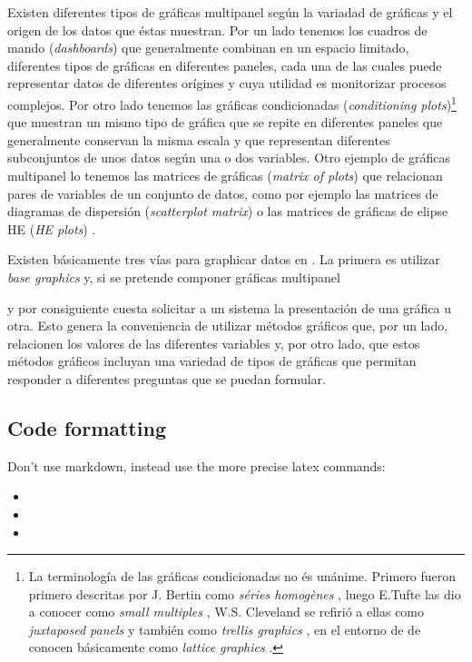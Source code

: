 \documentclass[jss]{jss}
\begin{document}
Existen diferentes tipos de gráficas multipanel según la variadad de
gráficas y el origen de los datos que éstas muestran. Por un lado
tenemos los cuadros de mando (\emph{dashboards}) que generalmente
combinan en un espacio limitado, diferentes tipos de gráficas en
diferentes paneles, cada una de las cuales puede representar datos de
diferentes orígines y cuya utilidad es monitorizar procesos complejos.
Por otro lado tenemos las gráficas condicionadas (\emph{conditioning
plots})\footnote{La terminología de las gráficas condicionadas no és
  unánime. Primero fueron primero descritas por J. Bertin como
  \emph{séries homogènes} \citep[p.?]{Bertin1967}, luego E.Tufte las dio
  a conocer como \emph{small multiples} \citep{Tufte1983}, W.S.
  Cleveland se refirió a ellas como \emph{juxtaposed panels}
  \citep[p.200]{Cleveland1985} y también como \emph{trellis graphics}
  \citep{Becker1996}, en el entorno de  de conocen
  básicamente como \emph{lattice graphics} \citep{Sarkar2008}.} que
muestran un mismo tipo de gráfica que se repite en diferentes paneles
que generalmente conservan la misma escala y que representan diferentes
subconjuntos de unos datos según una o dos variables. Otro ejemplo de
gráficas multipanel lo tenemos las matrices de gráficas (\emph{matrix of
plots}) que relacionan pares de variables de un conjunto de datos, como
por ejemplo las matrices de diagramas de dispersión (\emph{scatterplot
matrix}) \citep{Hartigan1975} o las matrices de gráficas de elipse HE
(\emph{HE plots}) \citep{Friendly2007}.

Existen básicamente tres vías para graphicar datos en . La
primera es utilizar \emph{base graphics} y, si se pretende componer
gráficas multipanel

y por consiguiente cuesta solicitar a un sistema la presentación de una
gráfica u otra. Esto genera la conveniencia de utilizar métodos gráficos
que, por un lado, relacionen los valores de las diferentes variables y,
por otro lado, que estos métodos gráficos incluyan una variedad de tipos
de gráficas que permitan responder a diferentes preguntas que se puedan
formular.

\hypertarget{code-formatting}{%
\subsection{Code formatting}\label{code-formatting}}

Don't use markdown, instead use the more precise latex commands:

\begin{itemize}
\item
\item
\item
\end{itemize}
\end{document}
